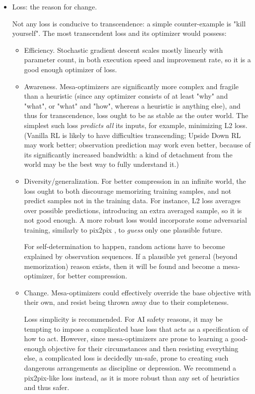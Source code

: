 \documentclass{article}
\begin{document}
\begin{itemize}
\item Loss: the reason for change.

Not any loss is conducive to transcendence: a simple counter-example is "kill yourself". The most transcendent loss and its optimizer would possess:
\begin{itemize}
\item Efficiency. Stochastic gradient descent scales mostly linearly with parameter count, in both execution speed and improvement rate, so it is a good enough optimizer of loss.
\item Awareness. Mesa-optimizers are significantly more complex and fragile than a heuristic (since any optimizer consists of at least "why" and "what", or "what" and "how", whereas a heuristic is anything else), and thus for transcendence, loss ought to be as stable as the outer world. The simplest such loss \textit{predicts all} its inputs, for example, minimizing L2 loss. (Vanilla RL is likely to have difficulties transcending; Upside Down RL \cite{schmidhuber2020reinforcement} may work better; observation prediction may work even better, because of its significantly increased bandwidth: a kind of detachment from the world may be the best way to fully understand it.)
\item Diversity/generalization. For better compression in an infinite world, the loss ought to both discourage memorizing training samples, and not predict samples not in the training data. For instance, L2 loss averages over possible predictions, introducing an extra averaged sample, so it is not good enough. A more robust loss would incorporate some adversarial training, similarly to pix2pix \cite{pix2pix2017}, to \textit{guess} only one plausible future.

For self-determination to happen, random actions have to become explained by observation sequences. If a plausible yet general (beyond memorization) reason exists, then it will be found and become a mesa-optimizer, for better compression.
\item Change. Mesa-optimizers could effectively override the base objective with their own, and resist being thrown away due to their completeness.

Loss simplicity is recommended. For AI safety reasons, it may be tempting to impose a complicated base loss that acts as a specification of how to act. However, since mesa-optimizers are prone to learning a good-enough objective for their circumstances and then resisting everything else, a complicated loss is decidedly un-safe, prone to creating such dangerous \cite{hubinger2019risks} arrangements as discipline or depression. We recommend a pix2pix-like loss \cite{pix2pix2017} instead, as it is more robust than any set of heuristics and thus safer.


\end{itemize}
\end{itemize}
\end{document}
